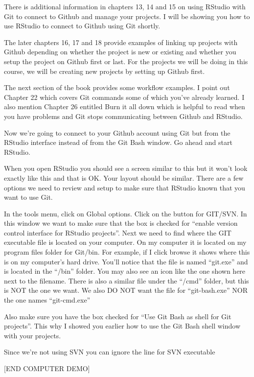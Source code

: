 \documentclass[]{book}
\theoremstyle{definition}
\theoremstyle{definition}
\theoremstyle{definition}
\theoremstyle{remark}
\begin{document}
There is additional information in chapters 13, 14 and 15 on using
RStudio with Git to connect to Github and manage your projects. I will
be showing you how to use RStudio to connect to Github using Git
shortly.

The later chapters 16, 17 and 18 provide examples of linking up projects
with Github depending on whether the project is new or existing and
whether you setup the project on Github first or last. For the projects
we will be doing in this course, we will be creating new projects by
setting up Github first.

The next section of the book provides some workflow examples. I point
out Chapter 22 which covers Git commands some of which you've already
learned. I also mention Chapter 26 entitled Burn it all down which is
helpful to read when you have problems and Git stops communicating
between Github and RStudio.

Now we're going to connect to your Github account using Git but from the
RStudio interface instead of from the Git Bash window. Go ahead and
start RStudio.

When you open RStudio you should see a screen similar to this but it
won't look exactly like this and that is OK. Your layout should be
similar. There are a few options we need to review and setup to make
sure that RStudio known that you want to use Git.

In the tools menu, click on Global options. Click on the button for
GIT/SVN. In this window we want to make sure that the box is checked for
``enable version control interface for RStudio projects''. Next we need
to find where the GIT executable file is located on your computer. On my
computer it is located on my program files folder for Git/bin. For
example, if I click browse it shows where this is on my computer's hard
drive. You'll notice that the file is named ``git.exe'' and is located
in the ``/bin'' folder. You may also see an icon like the one shown here
next to the filename. There is also a similar file under the ``/cmd''
folder, but this is NOT the one we want. We also DO NOT want the file
for ``git-bash.exe'' NOR the one names ``git-cmd.exe''

Also make sure you have the box checked for ``Use Git Bash as shell for
Git projects''. This why I showed you earlier how to use the Git Bash
shell window with your projects.

Since we're not using SVN you can ignore the line for SVN executable

{[}END COMPUTER DEMO{]}
\end{document}
